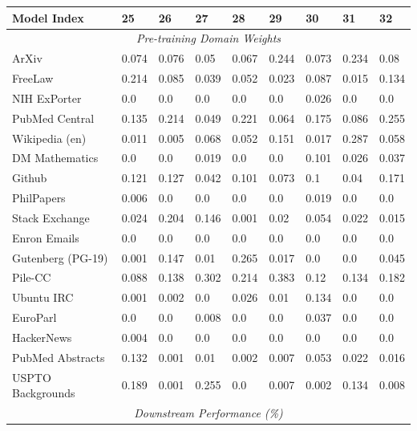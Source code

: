 \documentclass{article}
\theoremstyle{definition}
\theoremstyle{remark}
\begin{document}
\begin{table}[!ht]
    \centering
    \begin{tabular}{lllllllll}
    \toprule
        \textbf{Model Index} & \textbf{25} & \textbf{26} & \textbf{27} & \textbf{28} & \textbf{29} & \textbf{30} & \textbf{31} & \textbf{32} \\
        \midrule
        \multicolumn{9}{c}{\textit{Pre-training Domain Weights}} \\
        ArXiv & 0.074 & 0.076 & 0.05 & 0.067 & 0.244 & 0.073 & 0.234 & 0.08 \\ 
        FreeLaw & 0.214 & 0.085 & 0.039 & 0.052 & 0.023 & 0.087 & 0.015 & 0.134 \\ 
        NIH ExPorter & 0.0 & 0.0 & 0.0 & 0.0 & 0.0 & 0.026 & 0.0 & 0.0 \\ 
        PubMed Central & 0.135 & 0.214 & 0.049 & 0.221 & 0.064 & 0.175 & 0.086 & 0.255 \\ 
        Wikipedia (en) & 0.011 & 0.005 & 0.068 & 0.052 & 0.151 & 0.017 & 0.287 & 0.058 \\ 
        DM Mathematics & 0.0 & 0.0 & 0.019 & 0.0 & 0.0 & 0.101 & 0.026 & 0.037 \\ 
        Github & 0.121 & 0.127 & 0.042 & 0.101 & 0.073 & 0.1 & 0.04 & 0.171 \\ 
        PhilPapers & 0.006 & 0.0 & 0.0 & 0.0 & 0.0 & 0.019 & 0.0 & 0.0 \\ 
        Stack Exchange & 0.024 & 0.204 & 0.146 & 0.001 & 0.02 & 0.054 & 0.022 & 0.015 \\ 
        Enron Emails & 0.0 & 0.0 & 0.0 & 0.0 & 0.0 & 0.0 & 0.0 & 0.0 \\ 
        Gutenberg (PG-19) & 0.001 & 0.147 & 0.01 & 0.265 & 0.017 & 0.0 & 0.0 & 0.045 \\ 
        Pile-CC & 0.088 & 0.138 & 0.302 & 0.214 & 0.383 & 0.12 & 0.134 & 0.182 \\ 
        Ubuntu IRC & 0.001 & 0.002 & 0.0 & 0.026 & 0.01 & 0.134 & 0.0 & 0.0 \\ 
        EuroParl & 0.0 & 0.0 & 0.008 & 0.0 & 0.0 & 0.037 & 0.0 & 0.0 \\ 
        HackerNews & 0.004 & 0.0 & 0.0 & 0.0 & 0.0 & 0.0 & 0.0 & 0.0 \\ 
        PubMed Abstracts & 0.132 & 0.001 & 0.01 & 0.002 & 0.007 & 0.053 & 0.022 & 0.016 \\ 
        USPTO Backgrounds & 0.189 & 0.001 & 0.255 & 0.0 & 0.007 & 0.002 & 0.134 & 0.008 \\ 
        \midrule
        \multicolumn{9}{c}{\textit{Downstream Performance (\%)}} \\

\end{tabular}
\end{table}
\end{document}
